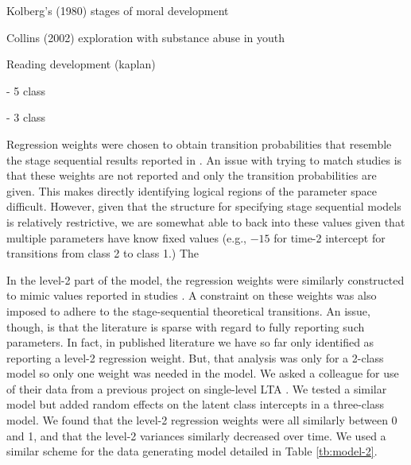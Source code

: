 \documentclass[man, noextraspace, floatsintext, 12pt]{apa7}
\begin{document}
Kolberg's (1980) stages of moral development

Collins (2002) exploration with substance abuse in youth

Reading development (kaplan)

\citep{Kaplan2005}
- 5 class

\citep{Kaplan2008}
- 3 class

Regression weights were chosen to obtain transition probabilities that resemble the stage sequential results reported in \textcite{Kaplan2005, Kaplan2011, Auerbach2006,  Koukounari2013}.
An issue with trying to match studies is that these weights are not reported and only the transition probabilities are given.
This makes directly identifying logical regions of the parameter space difficult.
However, given that the structure for specifying stage sequential models is relatively restrictive, we are somewhat able to back into these values given that multiple parameters have know fixed values (e.g., $-15$ for time-2 intercept for transitions from class 2 to class 1.)
The 

In the level-2 part of the model, the regression weights were similarly constructed to mimic values reported in studies \citep{Asparouhov2008}.
A constraint on these weights was also imposed to adhere to the stage-sequential theoretical transitions.
An issue, though, is that the literature is sparse with regard to fully reporting such parameters.
In fact, in published literature we have so far only identified \textcite{Asparouhov2008} as reporting a level-2 regression weight.
But, that analysis was only for a 2-class model so only one weight was needed in the model.
We asked a colleague for use of their data from a previous project on single-level LTA \citep{McKay2020}.
We tested a similar model but added random effects on the latent class intercepts in a three-class model.
We found that the level-2 regression weights were all similarly between 0 and 1, and that the level-2 variances similarly decreased over time.
We used a similar scheme for the data generating model detailed in Table \ref{tb:model-2}.
\end{document}
